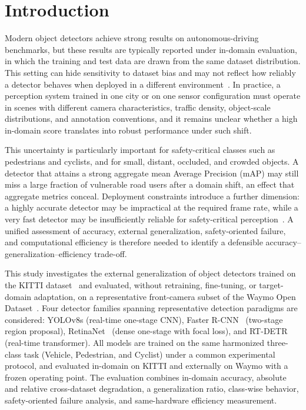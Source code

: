 \section{Introduction}
\label{sec:introduction}

Modern object detectors achieve strong results on autonomous-driving benchmarks, but
these results are typically reported under in-domain evaluation, in which the training and
test data are drawn from the same dataset distribution. This setting can hide sensitivity
to dataset bias and may not reflect how reliably a detector behaves when deployed in a
different environment~\cite{geiger2012kitti,sun2020waymo}. In practice, a perception
system trained in one city or on one sensor configuration must operate in scenes with
different camera characteristics, traffic density, object-scale distributions, and
annotation conventions, and it remains unclear whether a high in-domain score translates
into robust performance under such shift.

This uncertainty is particularly important for safety-critical classes such as pedestrians
and cyclists, and for small, distant, occluded, and crowded objects. A detector that
attains a strong aggregate mean Average Precision (mAP) may still miss a large fraction
of vulnerable road users after a domain shift, an effect that aggregate metrics conceal.
Deployment constraints introduce a further dimension: a highly accurate detector may be
impractical at the required frame rate, while a very fast detector may be insufficiently
reliable for safety-critical perception~\cite{yang2022streaming,wang2023asap}. A
unified assessment of accuracy, external generalization, safety-oriented failure, and
computational efficiency is therefore needed to identify a defensible
accuracy--generalization--efficiency trade-off.

This study investigates the external generalization of object detectors trained on the
KITTI dataset~\cite{geiger2012kitti} and evaluated, without retraining, fine-tuning, or
target-domain adaptation, on a representative front-camera subset of the Waymo Open
Dataset~\cite{sun2020waymo}. Four detector families spanning representative detection
paradigms are considered: YOLOv8s (real-time one-stage CNN),
Faster R-CNN~\cite{ren2015fasterrcnn} (two-stage region proposal),
RetinaNet~\cite{lin2017focalloss} (dense one-stage with focal loss), and
RT-DETR~\cite{zhao2024rtdetr} (real-time transformer). All models are trained on the
same harmonized three-class task (Vehicle, Pedestrian, and Cyclist) under a common
experimental protocol, and evaluated in-domain on KITTI and externally on Waymo with a
frozen operating point. The evaluation combines in-domain accuracy, absolute and relative
cross-dataset degradation, a generalization ratio, class-wise behavior, safety-oriented
failure analysis, and same-hardware efficiency measurement.

